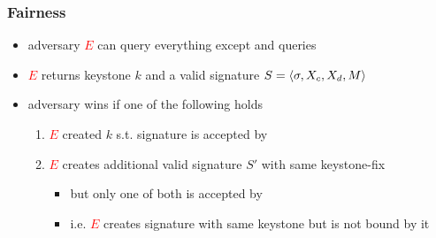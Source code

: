 \begin{frame}
	\frametitle{Fairness}

	\begin{itemize}[<+->]
    \setlength\itemsep{1em}
    \item adversary \textcolor{Red}{$E$} can query everything except \averify and \verify queries
		\item \textcolor{Red}{$E$} returns keystone $k$ and a \textcolor{BurntOrange}{valid} signature $S = \langle \sigma, X_c, X_d, M \rangle$
		\item adversary wins if one of the following holds
      \begin{enumerate}[(1.)]
        \setlength\itemsep{.75em}  
				\item \textcolor{Red}{$E$} created $k$ s.t. signature is accepted by \verify
				\item \textcolor{Red}{$E$} creates additional \textcolor{BurntOrange}{valid} signature $S'$ with same keystone-fix
          \begin{itemize}
            \item but only one of both is accepted by \verify
            \item i.e. \textcolor{Red}{$E$} creates signature with same keystone but is not bound by it
          \end{itemize}
			\end{enumerate}
	\end{itemize}
\end{frame}